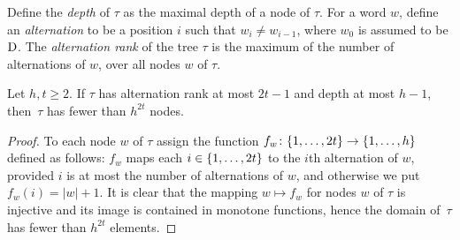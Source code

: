 Define the
\emph{depth} of $\tau$ as 
the maximal depth of a node of $\tau$.
For a word $w$, define an \emph{alternation} to be 
a position $i$ such that $w_i\neq w_{i-1}$, where $w_0$ is assumed to be $\mathrm{D}$.
 The \emph{alternation rank} of the tree $\tau$ is the maximum of the number of alternations of $w$, over all nodes $w$ of $\tau$.


\begin{lemma}\label{lem:number-of-nodes}
Let $h,t\ge 2$.	If $\tau$ has alternation rank at most $2t-1$ and depth at most $h-1$, then~$\tau$ has fewer than $h^{2t}$ nodes.
\end{lemma}
\begin{proof}		
	To each node $w$ of $\tau$ assign 
	the function $f_w\colon \{1,\ldots,2t\}\to\{1,\ldots,h\}$ defined as follows:
	$f_w$ maps each $i\in \{1,\ldots,2t\}$ to the $i$th alternation of $w$, provided $i$ is at most the number of alternations of $w$, and otherwise we put $f_w(i)=|w|+1$.
	It is clear that the mapping $w\mapsto f_w$ for nodes $w$ of $\tau$ is injective
and its image is contained in monotone functions, hence the domain of~$\tau$ 
		has fewer than $h^{2t}$ elements.
\end{proof}

